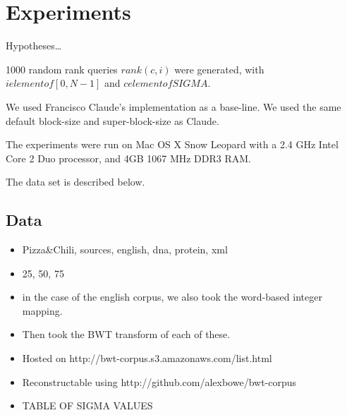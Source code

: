 \section{Experiments}

Hypotheses\ldots{}

1000 random rank queries $rank(c, i)$ were generated, with
$i elementof [0, N-1]$ and $c elementof SIGMA$.

We used Francisco Claude's implementation as a base-line. We used
the same default block-size and super-block-size as Claude.

The experiments were run on Mac OS X Snow Leopard with a 2.4 GHz
Intel Core 2 Duo processor, and 4GB 1067 MHz DDR3 RAM.

The data set is described below.

\subsection{Data}

\begin{itemize}
\item
  Pizza\&Chili, sources, english, dna, protein, xml
\item
  25, 50, 75
\item
  in the case of the english corpus, we also took the word-based
  integer mapping.
\item
  Then took the BWT transform of each of these.
\item
  Hosted on http://bwt-corpus.s3.amazonaws.com/list.html
\item
  Reconstructable using http://github.com/alexbowe/bwt-corpus
\item
  TABLE OF SIGMA VALUES
\end{itemize}
